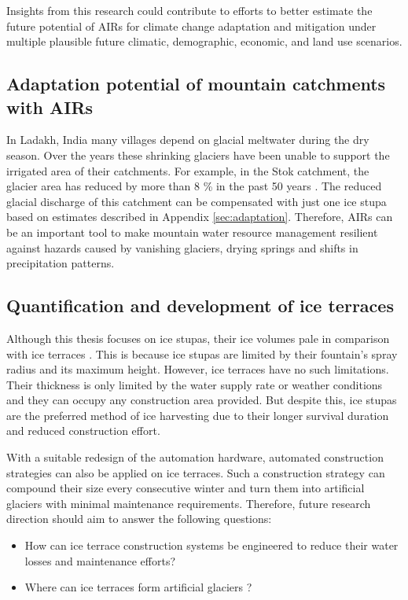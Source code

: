 Insights from this research could contribute to efforts to better estimate the future potential of AIRs for
climate change adaptation and mitigation under multiple plausible future climatic, demographic, economic, and
land use scenarios. 


\subsection{Adaptation potential of mountain catchments with AIRs}

In Ladakh, India many villages depend on glacial meltwater during the dry season. Over the years these shrinking
glaciers have been unable to support the irrigated area of their catchments. For example, in the Stok catchment,
the glacier area has reduced by more than 8 \% in the past 50 years
\cite{sohebMassbalanceObservationReconstruction2020}. The reduced glacial discharge of this catchment can be
compensated with just one ice stupa based on estimates described in Appendix \ref{sec:adaptation}. Therefore,
AIRs can be an important tool to make mountain water resource management resilient against hazards caused by
vanishing glaciers, drying springs and shifts in precipitation patterns. 

\subsection{Quantification and development of ice terraces}

Although this thesis focuses on ice stupas, their ice volumes pale in comparison with ice terraces
\citep{nusserSociohydrologyArtificialGlaciers2019}. This is because ice stupas are limited by their fountain's
spray radius and its maximum height. However, ice terraces have no such limitations. Their thickness is only
limited by the water supply rate or weather conditions and they can occupy any construction area provided. But
despite this, ice stupas are the preferred method of ice harvesting due to their longer survival duration and
reduced construction effort.

With a suitable redesign of the automation hardware, automated construction strategies can also be applied on
ice terraces. Such a construction strategy can compound their size every consecutive winter and turn them into
artificial glaciers with minimal maintenance requirements. Therefore, future research direction should aim to
answer the following questions:

\begin{itemize}

  \item How can ice terrace construction systems be engineered to reduce their water losses and maintenance
    efforts?
  \item Where can ice terraces form artificial glaciers ? 

\end{itemize}

